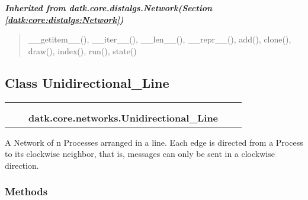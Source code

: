 \large{\textbf{\textit{Inherited from datk.core.distalgs.Network\textit{(Section \ref{datk:core:distalgs:Network})}}}}

\begin{quote}
\_\_getitem\_\_(), \_\_iter\_\_(), \_\_len\_\_(), \_\_repr\_\_(), add(), clone(), draw(), index(), run(), state()
\end{quote}


\subsection{Class Unidirectional\_Line}

    \label{datk:core:networks:Unidirectional_Line}
\begin{tabular}{cccccc}
\multicolumn{2}{r}{\settowidth{\BCL}{datk.core.distalgs.Network}\multirow{2}{\BCL}{datk.core.distalgs.Network}}
&&
  \\\cline{3-3}
  &&\multicolumn{1}{c|}{}
&&
  \\
&&\multicolumn{2}{l}{\textbf{datk.core.networks.Unidirectional\_Line}}
\end{tabular}

A Network of n Processes arranged in a line. Each edge is directed from a 
Process to its clockwise neighbor, that is, messages can only be sent in a 
clockwise direction.



  \subsubsection{Methods}

    \vspace{0.5ex}

